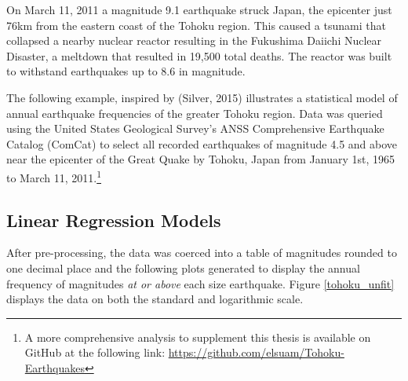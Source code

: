 
On March 11, 2011 a magnitude 9.1 earthquake struck Japan, the epicenter just 76km from the eastern coast of the Tohoku region.  This caused a tsunami that collapsed a nearby nuclear reactor resulting in the Fukushima Daiichi Nuclear Disaster, a meltdown that resulted in 19,500 total deaths.  The reactor was built to withstand earthquakes up to 8.6 in magnitude.

The following example, inspired by (Silver, 2015)\cite{silver2015signal} illustrates a statistical model of annual earthquake frequencies of the greater Tohoku region.
Data was queried using the United States Geological Survey's ANSS Comprehensive Earthquake Catalog (ComCat)
to select all recorded earthquakes of magnitude 4.5 and above near the epicenter of the Great Quake by Tohoku, Japan from January 1st, 1965 to March 11, 2011.\footnote{A more comprehensive analysis to supplement this thesis is available on GitHub at the following link: 
\url{https://github.com/elsuam/Tohoku-Earthquakes}}

\subsection{Linear Regression Models}

After pre-processing, the data was coerced into a table of magnitudes rounded to one decimal place and the following plots generated to display the annual frequency of magnitudes \textit{at or above} each size earthquake.  Figure \ref{tohoku_unfit} displays the data on both the standard and logarithmic scale.

